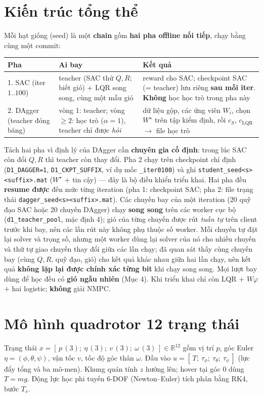 \documentclass[11pt]{article}
\newcommand{\R}{\mathbb{R}}
\newcommand{\cS}{c_{S}}
\newcommand{\cL}{c_{\mathrm{LQR}}}
\begin{document}
\section{Kiến trúc tổng thể}
Mỗi hạt giống (seed) là một \textbf{chain} gồm \textbf{hai pha offline nối tiếp}, chạy bằng cùng một commit:
\begin{center}\small
\begin{tabular}{@{}p{3.3cm} p{5.0cm} p{6.0cm}@{}}
\toprule
\textbf{Pha} & \textbf{Ai bay} & \textbf{Kết quả}\\
\midrule
1. SAC (iter $1..100$) & teacher (SAC thử $Q,R$; biết gió) $+$ LQR song song, cùng một mẫu gió & reward cho SAC;
checkpoint SAC (= teacher) lưu riêng \textbf{sau mỗi iter}. \textbf{Không} học học trò trong pha này\\
2. DAgger (teacher đóng băng) & vòng 1: teacher; vòng $\ge2$: học trò ($\alpha=1$), teacher chỉ được \emph{hỏi} & dữ
liệu gộp, các ứng viên $W_i$, chọn $W^\star$ trên tập kiểm định, rồi $\cS$, $\cL$ $\to$ file học trò\\
\bottomrule
\end{tabular}
\end{center}
Tách hai pha vì định lý của DAgger cần \textbf{chuyên gia cố định}: trong lúc SAC còn đổi $Q,R$ thì teacher
còn thay đổi. Pha 2 chạy trên checkpoint chỉ định (\texttt{D1\_DAGGER=1}, \texttt{D1\_CKPT\_SUFFIX}, ví dụ mốc
\texttt{\_iter0100}) và ghi \texttt{student\_seed<s><suffix>.mat} ($W^\star$ $+$ tin cậy) --- đây là bộ điều khiển
triển khai. Hai pha đều \textbf{resume được} đến mức từng iteration (pha 1: checkpoint SAC; pha 2: file trạng thái
\texttt{dagger\_seed<s><suffix>.mat}). Các chuyến bay của một iteration (20 quỹ đạo SAC hoặc 20 chuyến DAgger)
chạy \textbf{song song} trên các worker cục bộ (\texttt{d1\_teacher\_pool}, mặc định 4); gió của từng chuyến được
rút \emph{tuần tự} trên client trước khi bay, nên các lần rút này không phụ thuộc số worker. Mỗi chuyến tự đặt lại
solver và trọng số, nhưng một worker dùng lại solver của nó cho nhiều chuyến và thứ tự giao chuyến thay đổi giữa các
lần chạy; đã quan sát thấy cùng chuyến bay (cùng $Q,R$, quỹ đạo, gió) cho kết quả khác nhau giữa hai lần chạy, nên
kết quả \textbf{không lặp lại được chính xác từng bit} khi chạy song song. Mọi lượt bay dùng để học đều có \textbf{gió ngẫu nhiên}
(Mục 4). Khi triển khai chỉ còn LQR $+$ $W\varphi$ $+$ hai logistic; \textbf{không} giải NMPC.

\section{Mô hình quadrotor 12 trạng thái}
Trạng thái $x=[\,p\,(3);\ \eta\,(3);\ v\,(3);\ \omega\,(3)\,]\in\R^{12}$ gồm vị trí $p$, góc Euler
$\eta=(\phi,\theta,\psi)$, vận tốc $v$, tốc độ góc thân $\omega$. Đầu vào
$u=[\,T;\ \tau_\phi;\ \tau_\theta;\ \tau_\psi\,]$ (lực đẩy tổng và ba mô-men). Khung quán tính $z$ hướng
lên; hover tại góc $0$ dùng $T=mg$. Động lực học phi tuyến 6-DOF (Newton–Euler) tích phân bằng RK4, bước
$T_s$.
\end{document}
